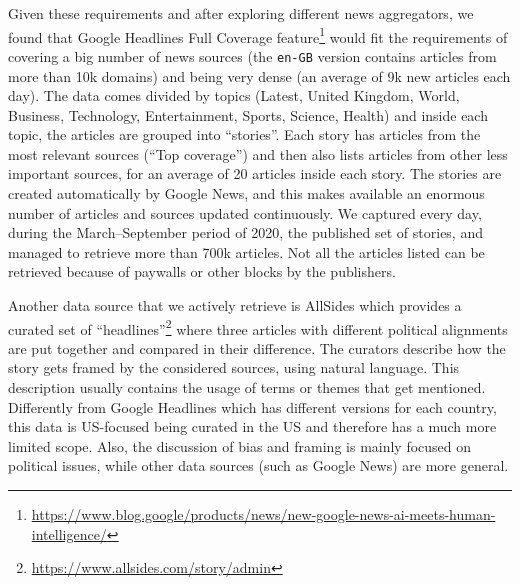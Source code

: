 Given these requirements and after exploring different news aggregators, we found that Google Headlines Full Coverage feature\footnote{\url{https://www.blog.google/products/news/new-google-news-ai-meets-human-intelligence/}} would fit the requirements of covering a big number of news sources (the \texttt{en-GB} version contains articles from more than 10k domains) and being very dense (an average of 9k new articles each day).
The data comes divided by topics (Latest, United Kingdom, World, Business, Technology, Entertainment, Sports, Science, Health) and inside each topic, the articles are grouped into ``stories''. Each story has articles from the most relevant sources (``Top coverage'') and then also lists articles from other less important sources, for an average of 20 articles inside each story.
The stories are created automatically by Google News, and this makes available an enormous number of articles and sources updated continuously. %
We captured every day, during the March–September period of 2020, the published set of stories, and managed to retrieve more than 700k articles. Not all the articles listed can be retrieved because of paywalls or other blocks by the publishers.

Another data source that we actively retrieve is AllSides which provides a curated set of ``headlines''\footnote{\url{https://www.allsides.com/story/admin}} where three articles with different political alignments are put together and compared in their difference.
The curators describe how the story gets framed by the considered sources, using natural language.
This description usually contains the usage of terms or themes that get mentioned.
Differently from Google Headlines which has different versions for each country, this data is US-focused being curated in the US and therefore has a much more limited scope. Also, the discussion of bias and framing is mainly focused on political issues, while other data sources (such as Google News) are more general. %

